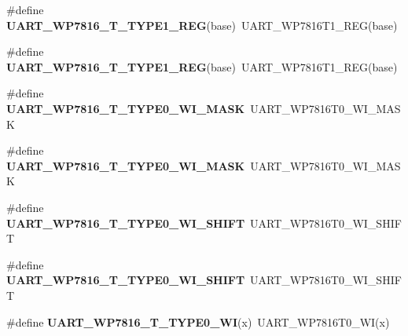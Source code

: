 \begin{DoxyCompactItemize}
\item 
\#define {\bfseries U\+A\+R\+T\+\_\+\+W\+P7816\+\_\+\+T\+\_\+\+T\+Y\+P\+E1\+\_\+\+R\+EG}(base)~U\+A\+R\+T\+\_\+\+W\+P7816\+T1\+\_\+\+R\+EG(base)\hypertarget{group__Backward__Compatibility__Symbols_ga5b2fc81c8b3403186dcbdd324f517246}{}\label{group__Backward__Compatibility__Symbols_ga5b2fc81c8b3403186dcbdd324f517246}

\item 
\#define {\bfseries U\+A\+R\+T\+\_\+\+W\+P7816\+\_\+\+T\+\_\+\+T\+Y\+P\+E1\+\_\+\+R\+EG}(base)~U\+A\+R\+T\+\_\+\+W\+P7816\+T1\+\_\+\+R\+EG(base)\hypertarget{group__Backward__Compatibility__Symbols_ga5b2fc81c8b3403186dcbdd324f517246}{}\label{group__Backward__Compatibility__Symbols_ga5b2fc81c8b3403186dcbdd324f517246}

\item 
\#define {\bfseries U\+A\+R\+T\+\_\+\+W\+P7816\+\_\+\+T\+\_\+\+T\+Y\+P\+E0\+\_\+\+W\+I\+\_\+\+M\+A\+SK}~U\+A\+R\+T\+\_\+\+W\+P7816\+T0\+\_\+\+W\+I\+\_\+\+M\+A\+SK\hypertarget{group__Backward__Compatibility__Symbols_ga286b20da1c2d027adb43e13a29d0148b}{}\label{group__Backward__Compatibility__Symbols_ga286b20da1c2d027adb43e13a29d0148b}

\item 
\#define {\bfseries U\+A\+R\+T\+\_\+\+W\+P7816\+\_\+\+T\+\_\+\+T\+Y\+P\+E0\+\_\+\+W\+I\+\_\+\+M\+A\+SK}~U\+A\+R\+T\+\_\+\+W\+P7816\+T0\+\_\+\+W\+I\+\_\+\+M\+A\+SK\hypertarget{group__Backward__Compatibility__Symbols_ga286b20da1c2d027adb43e13a29d0148b}{}\label{group__Backward__Compatibility__Symbols_ga286b20da1c2d027adb43e13a29d0148b}

\item 
\#define {\bfseries U\+A\+R\+T\+\_\+\+W\+P7816\+\_\+\+T\+\_\+\+T\+Y\+P\+E0\+\_\+\+W\+I\+\_\+\+S\+H\+I\+FT}~U\+A\+R\+T\+\_\+\+W\+P7816\+T0\+\_\+\+W\+I\+\_\+\+S\+H\+I\+FT\hypertarget{group__Backward__Compatibility__Symbols_ga2abd3cac45b65c8608d7acb2c985f56e}{}\label{group__Backward__Compatibility__Symbols_ga2abd3cac45b65c8608d7acb2c985f56e}

\item 
\#define {\bfseries U\+A\+R\+T\+\_\+\+W\+P7816\+\_\+\+T\+\_\+\+T\+Y\+P\+E0\+\_\+\+W\+I\+\_\+\+S\+H\+I\+FT}~U\+A\+R\+T\+\_\+\+W\+P7816\+T0\+\_\+\+W\+I\+\_\+\+S\+H\+I\+FT\hypertarget{group__Backward__Compatibility__Symbols_ga2abd3cac45b65c8608d7acb2c985f56e}{}\label{group__Backward__Compatibility__Symbols_ga2abd3cac45b65c8608d7acb2c985f56e}

\item 
\#define {\bfseries U\+A\+R\+T\+\_\+\+W\+P7816\+\_\+\+T\+\_\+\+T\+Y\+P\+E0\+\_\+\+WI}(x)~U\+A\+R\+T\+\_\+\+W\+P7816\+T0\+\_\+\+WI(x)\hypertarget{group__Backward__Compatibility__Symbols_ga1d1dbaccc030f4bb7c78161c422cfd6c}{}\label{group__Backward__Compatibility__Symbols_ga1d1dbaccc030f4bb7c78161c422cfd6c}


\end{DoxyCompactItemize}
